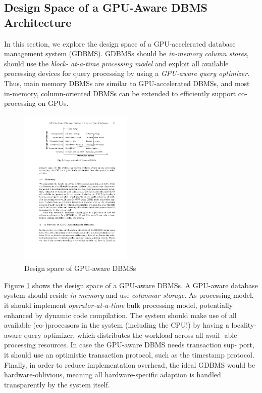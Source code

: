 \documentclass[twocolumn]{article}
\begin{document}
\subsection{Design Space of a GPU-Aware DBMS Architecture}
In this section, we explore the design space of a GPU-accelerated database management system (GDBMS). 
GDBMSs should be \textit{in-memory column stores}, should use the \textit{block- at-a-time processing model }and exploit all available processing devices for query processing by using a \textit{GPU-aware query optimizer}.
 Thus, main memory DBMSs are similar to GPU-accelerated DBMSs, and most in-memory, column-oriented DBMSs can be extended to efficiently support co-processing on GPUs.
\begin{figure}[htb]
        \centering
        \includegraphics[width=0.48\textwidth]{design-space.pdf}
        \caption{Design space of GPU-aware DBMSs}
        \label{fig:design-space}
\end{figure}
Figure \ref{fig:design-space} shows the design space of a GPU-aware DBMSs.
A GPU-aware database system should reside \textit{in-memory} and use \textit{columnar storage}. 
As processing model, it should implement \textit{operator-at-a-time} bulk processing model, potentially enhanced by dynamic code compilation. 
The system should make use of all available (co-)processors in the system (including the CPU!) by having a locality-aware query optimizer, which distributes the workload across all avail- able processing resources. In case the GPU-aware DBMS needs transaction sup- port, it should use an optimistic transaction protocol, such as the timestamp protocol. Finally, in order to reduce implementation overhead, the ideal GDBMS would be hardware-oblivious, meaning all hardware-specific adaption is handled transparently by the system itself.
\end{document}
